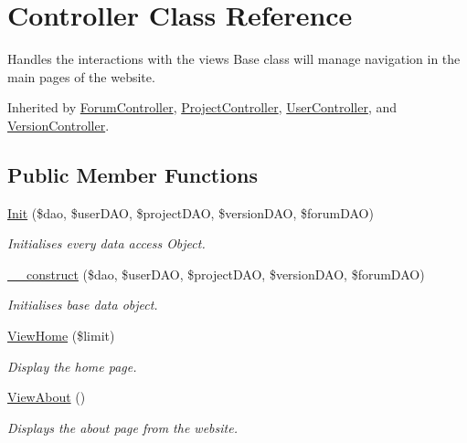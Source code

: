 \hypertarget{class_controller}{}\section{Controller Class Reference}
\label{class_controller}


Handles the interactions with the views Base class will manage navigation in the main pages of the website.  




Inherited by \hyperlink{class_forum_controller}{Forum\+Controller}, \hyperlink{class_project_controller}{Project\+Controller}, \hyperlink{class_user_controller}{User\+Controller}, and \hyperlink{class_version_controller}{Version\+Controller}.

\subsection*{Public Member Functions}
\begin{DoxyCompactItemize}
\item 
\hyperlink{class_controller_a4b9462f290a447541323a8a21484c193}{Init} (\$dao, \$user\+D\+AO, \$project\+D\+AO, \$version\+D\+AO, \$forum\+D\+AO)
\begin{DoxyCompactList}\small\item\em Initialises every data access Object. \end{DoxyCompactList}\item 
\hyperlink{class_controller_a1dd81c9e2ac2fc2ca00acd06ce8a86e9}{\+\_\+\+\_\+construct} (\$dao, \$user\+D\+AO, \$project\+D\+AO, \$version\+D\+AO, \$forum\+D\+AO)
\begin{DoxyCompactList}\small\item\em Initialises base data object. \end{DoxyCompactList}\item 
\hyperlink{class_controller_a7366734beeaaaadceaff941c9929e8e5}{View\+Home} (\$limit)
\begin{DoxyCompactList}\small\item\em Display the home page. \end{DoxyCompactList}\item 
\hyperlink{class_controller_ac19e8736170dc90119edf57d097774d4}{View\+About} ()
\begin{DoxyCompactList}\small\item\em Displays the about page from the website. \end{DoxyCompactList}\end{DoxyCompactItemize}

